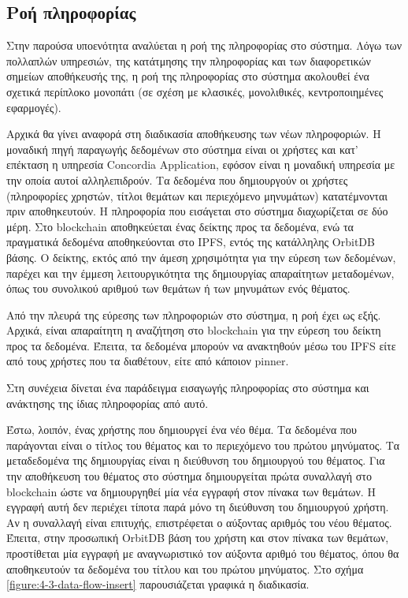 \subsection{Ροή πληροφορίας} \label{subsection:4-3-9-data-flow}

Στην παρούσα υποενότητα αναλύεται η ροή της πληροφορίας στο σύστημα. Λόγω των πολλαπλών υπηρεσιών, της κατάτμησης την πληροφορίας και των διαφορετικών σημείων αποθήκευσής της, η ροή της πληροφορίας στο σύστημα ακολουθεί ένα σχετικά περίπλοκο μονοπάτι (σε σχέση με κλασικές, μονολιθικές, κεντροποιημένες εφαρμογές).

Αρχικά θα γίνει αναφορά στη διαδικασία αποθήκευσης των νέων πληροφοριών. Η μοναδική πηγή παραγωγής δεδομένων στο σύστημα είναι οι χρήστες και κατ' επέκταση η υπηρεσία Concordia Application, εφόσον είναι η μοναδική υπηρεσία με την οποία αυτοί αλληλεπιδρούν. Τα δεδομένα που δημιουργούν οι χρήστες (πληροφορίες χρηστών, τίτλοι θεμάτων και περιεχόμενο μηνυμάτων) κατατέμνονται πριν αποθηκευτούν. Η πληροφορία που εισάγεται στο σύστημα διαχωρίζεται σε δύο μέρη. Στο blockchain αποθηκεύεται ένας δείκτης προς τα δεδομένα, ενώ τα πραγματικά δεδομένα αποθηκεύονται στο IPFS, εντός της κατάλληλης OrbitDB βάσης. Ο δείκτης, εκτός από την άμεση χρησιμότητα για την εύρεση των δεδομένων, παρέχει και την έμμεση λειτουργικότητα της δημιουργίας απαραίτητων μεταδομένων, όπως του συνολικού αριθμού των θεμάτων ή των μηνυμάτων ενός θέματος.

Από την πλευρά της εύρεσης των πληροφοριών στο σύστημα, η ροή έχει ως εξής. Αρχικά, είναι απαραίτητη η αναζήτηση στο blockchain για την εύρεση του δείκτη προς τα δεδομένα. Έπειτα, τα δεδομένα μπορούν να ανακτηθούν μέσω του IPFS είτε από τους χρήστες που τα διαθέτουν, είτε από κάποιον pinner.

Στη συνέχεια δίνεται ένα παράδειγμα εισαγωγής πληροφορίας στο σύστημα και ανάκτησης της ίδιας πληροφορίας από αυτό.

Έστω, λοιπόν, ένας χρήστης που δημιουργεί ένα νέο θέμα. Τα δεδομένα που παράγονται είναι ο τίτλος του θέματος και το περιεχόμενο του πρώτου μηνύματος. Τα μεταδεδομένα της δημιουργίας είναι η διεύθυνση του δημιουργού του θέματος. Για την αποθήκευση του θέματος στο σύστημα δημιουργείται πρώτα συναλλαγή στο blockchain ώστε να δημιουργηθεί μία νέα εγγραφή στον πίνακα των θεμάτων. Η εγγραφή αυτή δεν περιέχει τίποτα παρά μόνο τη διεύθυνση του δημιουργού χρήστη. Αν η συναλλαγή είναι επιτυχής, επιστρέφεται ο αύξοντας αριθμός του νέου θέματος. Έπειτα, στην προσωπική OrbitDB βάση του χρήστη και στον πίνακα των θεμάτων, προστίθεται μία εγγραφή με αναγνωριστικό τον αύξοντα αριθμό του θέματος, όπου θα αποθηκευτούν τα δεδομένα του τίτλου και του πρώτου μηνύματος. Στο σχήμα \ref{figure:4-3-data-flow-insert} παρουσιάζεται γραφικά η διαδικασία.


